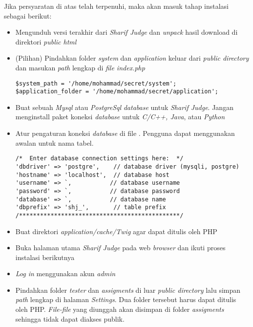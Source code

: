 Jika persyaratan di atas telah terpenuhi, maka akan masuk tahap instalasi sebagai berikut:
\begin{itemize}
	\item Mengunduh versi terakhir dari \textit{Sharif Judge} dan \textit{unpack} hasil download di direktori \textit{public html}
	\item (Pilihan) Pindahkan folder \textit{system} dan \textit{application} keluar dari \textit{public directory} dan
	masukan \textit{path} lengkap di \textit{file index.php} 
	\begin{lstlisting}[basicstyle=\ttfamily, frame=single,
columns=fullflexible, keepspaces=true, breaklines=true]
$system_path = '/home/mohammad/secret/system';
$application_folder = '/home/mohammad/secret/application';
\end{lstlisting}
	\item Buat sebuah \textit{Mysql} atau \textit{PostgreSql} \textit{database} untuk \textit{Sharif Judge}. Jangan menginstall paket koneksi \textit{database} untuk \textit{C/C++, Java}, atau \textit{Python}
	\item Atur pengaturan koneksi \textit{database} di file . Pengguna dapat menggunakan awalan untuk nama tabel.
	\begin{lstlisting}[basicstyle=\ttfamily, frame=single,
columns=fullflexible, keepspaces=true, breaklines=true]
/*  Enter database connection settings here:  */
'dbdriver' => 'postgre',    // database driver (mysqli, postgre)
'hostname' => 'localhost',  // database host
'username' => `,           // database username
'password' => `,           // database password
'database' => `,           // database name
'dbprefix' => 'shj_',       // table prefix
/**********************************************/
\end{lstlisting}
	\item Buat direktori \textit{application/cache/Twig} agar dapat ditulis oleh PHP
	\item Buka halaman utama \textit{Sharif Judge} pada web \textit{browser} dan ikuti proses instalasi berikutnya
	\item \textit{Log in} menggunakan akun \textit{admin}
	\item Pindahkan folder \textit{tester} dan \textit{assigments} di luar \textit{public directory} lalu simpan \textit{path} lengkap di halaman \textit{Settings}. Dua folder tersebut harus dapat ditulis oleh PHP. \textit{File-file} yang diunggah akan disimpan di folder \textit{assigments} sehingga tidak dapat diakses publik.
\end{itemize}

